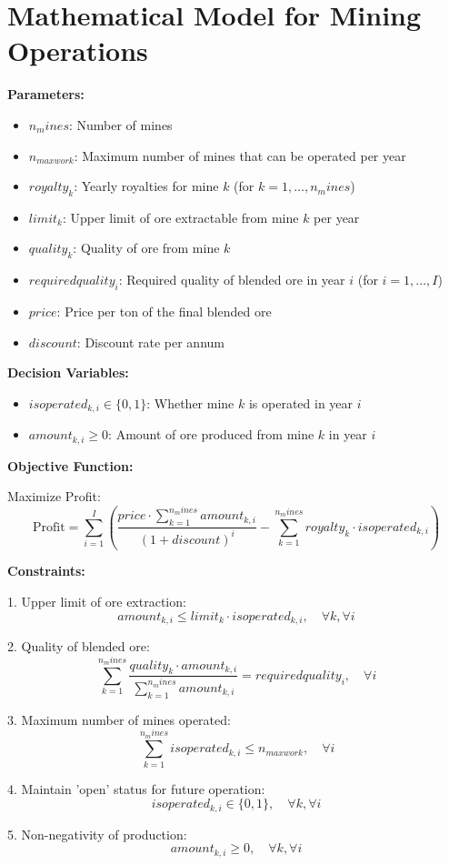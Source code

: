 \documentclass{article}
\begin{document}
\section*{Mathematical Model for Mining Operations}

\textbf{Parameters:}

\begin{itemize}
    \item $n_mines$: Number of mines
    \item $n_{maxwork}$: Maximum number of mines that can be operated per year
    \item $royalty_{k}$: Yearly royalties for mine $k$ (for $k = 1, \ldots, n_mines$)
    \item $limit_{k}$: Upper limit of ore extractable from mine $k$ per year
    \item $quality_{k}$: Quality of ore from mine $k$
    \item $requiredquality_{i}$: Required quality of blended ore in year $i$ (for $i = 1, \ldots, I$)
    \item $price$: Price per ton of the final blended ore
    \item $discount$: Discount rate per annum
\end{itemize}

\textbf{Decision Variables:}

\begin{itemize}
    \item $isoperated_{k,i} \in \{0, 1\}$: Whether mine $k$ is operated in year $i$
    \item $amount_{k,i} \geq 0$: Amount of ore produced from mine $k$ in year $i$
\end{itemize}

\textbf{Objective Function:}

Maximize Profit:
\[
\text{Profit} = \sum_{i=1}^{I} \left( \frac{price \cdot \sum_{k=1}^{n_mines} amount_{k,i}}{(1 + discount)^{i}} - \sum_{k=1}^{n_mines} royalty_{k} \cdot isoperated_{k,i} \right)
\]

\textbf{Constraints:}

1. Upper limit of ore extraction:
\[
amount_{k,i} \leq limit_{k} \cdot isoperated_{k,i}, \quad \forall k, \forall i
\]

2. Quality of blended ore:
\[
\sum_{k=1}^{n_mines} \frac{quality_{k} \cdot amount_{k,i}}{\sum_{k=1}^{n_mines} amount_{k,i}} = requiredquality_{i}, \quad \forall i
\]

3. Maximum number of mines operated:
\[
\sum_{k=1}^{n_mines} isoperated_{k,i} \leq n_{maxwork}, \quad \forall i
\]

4. Maintain 'open' status for future operation:
\[
isoperated_{k,i} \in \{0, 1\}, \quad \forall k, \forall i
\]

5. Non-negativity of production:
\[
amount_{k,i} \geq 0, \quad \forall k, \forall i
\]
\end{document}
